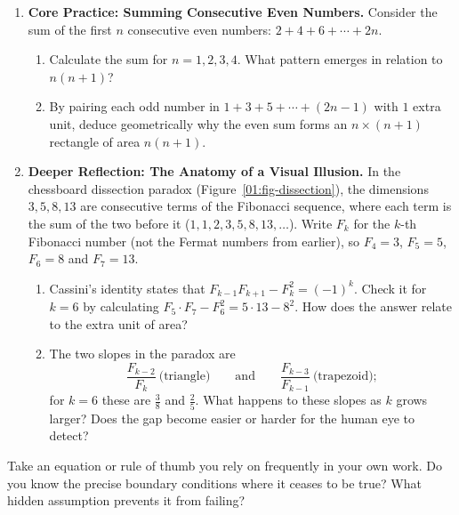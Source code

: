 \begin{enumerate}[label=\textbf{\arabic*.}]
\item \textbf{Core Practice: Summing Consecutive Even Numbers.}
Consider the sum of the first $n$ consecutive even numbers: $2 + 4 + 6 + \cdots + 2n$.
\begin{enumerate}[label=(\alph*)]
\item Calculate the sum for $n = 1, 2, 3, 4$. What pattern emerges in relation to $n(n+1)$?
\item By pairing each odd number in $1 + 3 + 5 + \cdots + (2n-1)$ with $1$ extra unit, deduce geometrically why the even sum forms an $n \times (n+1)$ rectangle of area $n(n+1)$.
\end{enumerate}

\item \textbf{Deeper Reflection: The Anatomy of a Visual Illusion.}
In the chessboard dissection paradox (Figure~\ref{01:fig-dissection}), the dimensions $3, 5, 8, 13$ are consecutive terms of the Fibonacci sequence, where each term is the sum of the two before it ($1, 1, 2, 3, 5, 8, 13, \dots$). Write $F_k$ for the $k$-th Fibonacci number (not the Fermat numbers from earlier), so $F_4 = 3$, $F_5 = 5$, $F_6 = 8$ and $F_7 = 13$.
\begin{enumerate}[label=(\alph*)]
\item Cassini's identity states that $F_{k-1} F_{k+1} - F_k^2 = (-1)^k$. Check it for $k = 6$ by calculating $F_5 \cdot F_7 - F_6^2 = 5 \cdot 13 - 8^2$. How does the answer relate to the extra unit of area?
\item The two slopes in the paradox are
\[
\frac{F_{k-2}}{F_k} \ \text{(triangle)} \qquad \text{and} \qquad \frac{F_{k-3}}{F_{k-1}} \ \text{(trapezoid)};
\]
for $k = 6$ these are $\frac{3}{8}$ and $\frac{2}{5}$. What happens to these slopes as $k$ grows larger? Does the gap become easier or harder for the human eye to detect?
\end{enumerate}
\end{enumerate}

\begin{walkbox}
Take an equation or rule of thumb you rely on frequently in your own work. Do you know the precise boundary conditions where it ceases to be true? What hidden assumption prevents it from failing?
\end{walkbox}

\newpage
